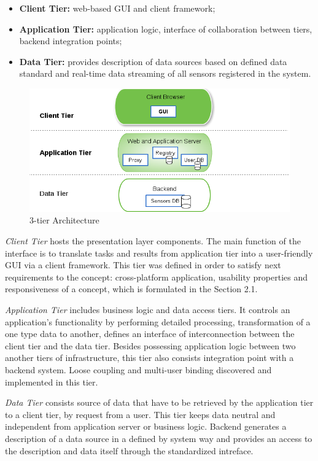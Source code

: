   \begin{itemize}
  \item \textbf{Client Tier:} web-based GUI and client framework;
  \item \textbf{Application Tier:} application logic, interface of collaboration between tiers, backend integration points;
  \item \textbf{Data Tier:} provides description of data sources based on defined data standard and real-time data streaming of all sensors registered in the system.
  \end{itemize} 

  \begin{figure}[!ht]
  \centering
  \includegraphics[scale=0.7]{images/3tier.png}   
  \caption[3-tier Architecture]{3-tier Architecture}
  \label{img:3-tier Architecture}                           
  \end{figure}

  \emph{Client Tier} hosts the presentation layer components. The main function of the interface is to translate tasks and results from application tier into a user-friendly GUI via a client framework. This tier was defined in order to satisfy next requirements to the concept: cross-platform application, usability properties and responsiveness of a concept, which is formulated in the Section 2.1.

  \emph{Application Tier} includes business logic and data access tiers. It controls an application's functionality by performing detailed processing, transformation of a one type data to another, defines an interface of interconnection between the client tier and the data tier. Besides possessing application logic between two another tiers of infrastructure, this tier also consists integration point with a backend system. Loose coupling and multi-user binding discovered and implemented in this tier.

  \emph{Data Tier} consists source of data that have to be retrieved by the application tier to a client tier, by request from a user. This tier keeps data neutral and independent from application server or business logic. Backend generates a description of a data source in a defined by system way and provides an access to the description and data itself through the standardized intreface.


